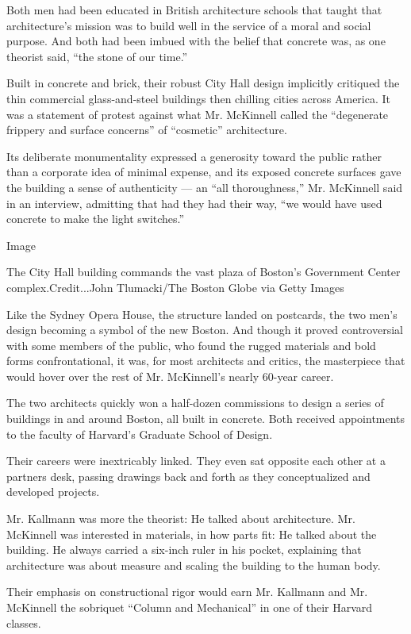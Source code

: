 Both men had been educated in British architecture schools that taught
that architecture's mission was to build well in the service of a moral
and social purpose. And both had been imbued with the belief that
concrete was, as one theorist said, ``the stone of our time.''

Built in concrete and brick, their robust City Hall design implicitly
critiqued the thin commercial glass-and-steel buildings then chilling
cities across America. It was a statement of protest against what Mr.
McKinnell called the ``degenerate frippery and surface concerns'' of
``cosmetic'' architecture.

Its deliberate monumentality expressed a generosity toward the public
rather than a corporate idea of minimal expense, and its exposed
concrete surfaces gave the building a sense of authenticity --- an ``all
thoroughness,'' Mr. McKinnell said in an interview, admitting that had
they had their way, ``we would have used concrete to make the light
switches.''

Image

The City Hall building commands the vast plaza of Boston's Government
Center complex.Credit...John Tlumacki/The Boston Globe via Getty Images

Like the Sydney Opera House, the structure landed on postcards, the two
men's design becoming a symbol of the new Boston. And though it proved
controversial with some members of the public, who found the rugged
materials and bold forms confrontational, it was, for most architects
and critics, the masterpiece that would hover over the rest of Mr.
McKinnell's nearly 60-year career.

The two architects quickly won a half-dozen commissions to design a
series of buildings in and around Boston, all built in concrete. Both
received appointments to the faculty of Harvard's Graduate School of
Design.

Their careers were inextricably linked. They even sat opposite each
other at a partners desk, passing drawings back and forth as they
conceptualized and developed projects.

Mr. Kallmann was more the theorist: He talked about architecture. Mr.
McKinnell was interested in materials, in how parts fit: He talked about
the building. He always carried a six-inch ruler in his pocket,
explaining that architecture was about measure and scaling the building
to the human body.

Their emphasis on constructional rigor would earn Mr. Kallmann and Mr.
McKinnell the sobriquet ``Column and Mechanical'' in one of their
Harvard classes.

